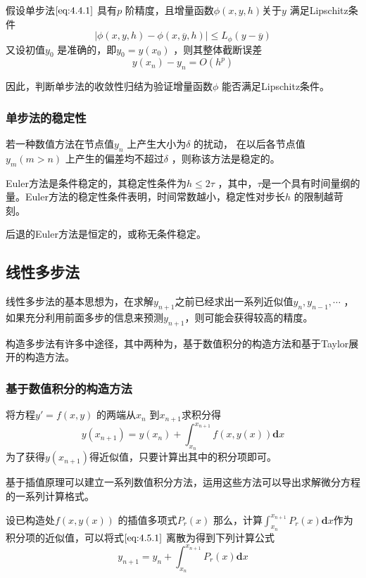 \documentclass[a4paper]{article}
\begin{document}
\begin{theorem}
	假设单步法$\ref{eq:4.4.1}$ 具有$p$ 阶精度，且增量函数$\phi(x,y,h)$关于$y$ 满足Lipschitz条件
	\[
	| \phi(x,y,h) - \phi(x,\overline{y}, h) | \le L_\phi(y - \overline{y}) \tag{4.4.2} \label{eq:4.4.2} 
	\] 
	又设初值$y_0$ 是准确的，即$y_0 = y(x_0)$ ，则其整体截断误差
	\[
	y(x_{n}) - y_{n} = O(h^{p}) \tag{4.4.3} \label{eq:4.4.3} 
	\] 
\end{theorem}
因此，判断单步法的收敛性归结为验证增量函数$\phi$ 能否满足Lipschitz条件。

\subsubsection{单步法的稳定性}
\begin{definition}
	若一种数值方法在节点值$y_{n}$ 上产生大小为$\delta$ 的扰动， 在以后各节点值$y_m(m > n)$ 上产生的偏差均不超过$\delta$ ，则称该方法是稳定的。
\end{definition}

Euler方法是条件稳定的，其稳定性条件为$h \le 2 \tau$ ，其中，$\tau$是一个具有时间量纲的量。Euler方法的稳定性条件表明，时间常数越小，稳定性对步长$h$ 的限制越苛刻。

后退的Euler方法是恒定的，或称无条件稳定。

\subsection{线性多步法}
线性多步法的基本思想为，在求解$y_{n+1}$之前已经求出一系列近似值$y_{n}, y_{n-1}, \cdots$ ，如果充分利用前面多步的信息来预测$y_{n+1}$，则可能会获得较高的精度。

构造多步法有许多中途径，其中两种为，基于数值积分的构造方法和基于Taylor展开的构造方法。

\subsubsection{基于数值积分的构造方法}
将方程$y' = f(x,y)$ 的两端从$x_{n}$ 到$x_{n+1}$求积分得
\[
y(x_{n+1}) = y(x_{n}) + \int_{x_{n}}^{x_{n+1}} f(x, y(x)) \mathbf{d} x \tag{4.5.1} \label{eq:4.5.1} 
\] 
为了获得$y(x_{n+1})$得近似值，只要计算出其中的积分项即可。

基于插值原理可以建立一系列数值积分方法，运用这些方法可以导出求解微分方程的一系列计算格式。

设已构造处$f(x, y(x))$ 的插值多项式$P_r(x)$ 那么，计算$\int_{x_{n}}^{x_{n+1}} P_r(x) \mathbf{d} x $作为积分项的近似值，可以将式$\ref{eq:4.5.1}$ 离散为得到下列计算公式
\[
y_{n+1} = y_{n} + \int_{x_{n}}^{x_{n+1}} P_r(x) \mathbf{d} x \tag{4.5.2} \label{eq:4.5.2} 
\]  
\end{document}
